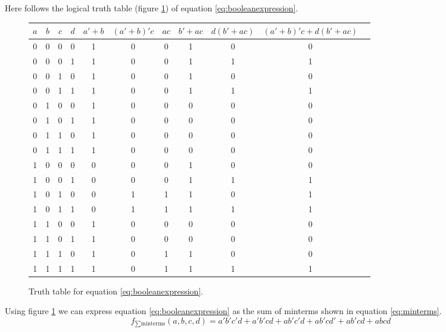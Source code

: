 \documentclass[11pt]{article}
\begin{document}
\begin{question}

	Here follows the logical truth table (figure \ref{fig:ttable}) of equation \ref{eq:booleanexpression}.

	\begin{figure}[h]
		\begin{center}
			\begin{tabular} {c c c c | c c c c c c c}
				$a$ & $b$ & $c$ & $d$ & $a'+b$ & $(a'+b)'c$ & $ac$ & $b'+ac$ & $d(b'+ac)$ & $(a'+b)'c+d(b'+ac)$ \\
				\hline
				0 & 0 & 0 & 0 & 1 & 0 & 0 & 1 & 0 & 0 \\
				0 & 0 & 0 & 1 & 1 & 0 & 0 & 1 & 1 & 1 \\
				0 & 0 & 1 & 0 & 1 & 0 & 0 & 1 & 0 & 0 \\
				0 & 0 & 1 & 1 & 1 & 0 & 0 & 1 & 1 & 1 \\
				0 & 1 & 0 & 0 & 1 & 0 & 0 & 0 & 0 & 0 \\
				0 & 1 & 0 & 1 & 1 & 0 & 0 & 0 & 0 & 0 \\
				0 & 1 & 1 & 0 & 1 & 0 & 0 & 0 & 0 & 0 \\
				0 & 1 & 1 & 1 & 1 & 0 & 0 & 0 & 0 & 0 \\
				1 & 0 & 0 & 0 & 0 & 0 & 0 & 1 & 0 & 0 \\
				1 & 0 & 0 & 1 & 0 & 0 & 0 & 1 & 1 & 1 \\
				1 & 0 & 1 & 0 & 0 & 1 & 1 & 1 & 0 & 1 \\
				1 & 0 & 1 & 1 & 0 & 1 & 1 & 1 & 1 & 1 \\
				1 & 1 & 0 & 0 & 1 & 0 & 0 & 0 & 0 & 0 \\
				1 & 1 & 0 & 1 & 1 & 0 & 0 & 0 & 0 & 0 \\
				1 & 1 & 1 & 0 & 1 & 0 & 1 & 1 & 0 & 0 \\
				1 & 1 & 1 & 1 & 1 & 0 & 1 & 1 & 1 & 1 \\
			\end{tabular}
		\end{center}
		\caption{
			\label{fig:ttable}
			Truth table for equation \ref{eq:booleanexpression}.
		}
	\end{figure}

	Using figure \ref{fig:ttable} we can express equation \ref{eq:booleanexpression}
	as the sum of minterms shown in equation \ref{eq:minterms}.
	\begin{equation}
		f_{\sum\text{minterms}}(a,b,c,d) =
		a'b'c'd
		+a'b'cd
		+ab'c'd
		+ab'cd'
		+ab'cd
		+abcd
		\label{eq:minterms}
	\end{equation}

\end{question}
\end{document}
